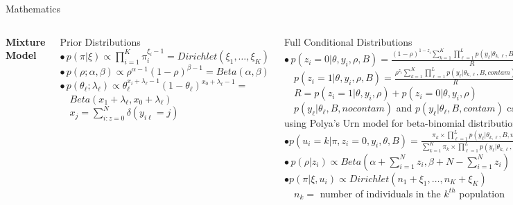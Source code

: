 \documentclass[letter,graphicx]{beamer}
\begin{document}
\begin{frame}{Mathematics}
\begin{tiny}
\begin{columns}[T]
\column{2.5in}
\begin{center}
\textbf{Mixture Model}
\end{center}

Prior Distributions \\ \vspace{2mm}
$\bullet \, p(\pi|\xi) \propto \prod_{i = 1}^K \pi_{i}^{\xi_i - 1} = Dirichlet(\xi_1, \ldots, \xi_K)$ \\
$\bullet \, p(\rho;\alpha,\beta) \propto \rho^{\alpha - 1}(1 - \rho)^{\beta - 1} = Beta(\alpha, \beta)$
$\bullet \, p(\theta_{\ell};\lambda_{\ell}) \propto \theta_{\ell}^{x_i + \lambda_{\ell}-1}(1 - \theta_{\ell})^{x_0 + \lambda_{\ell}-1} = $
\\ $\quad Beta(x_1 + \lambda_{\ell},x_0 + \lambda_{\ell})$ \\ 
$\quad x_j = \sum_{i:z=0}^{N} \delta(y_{i\ell} = j)$

Full Conditional Distributions \\ \vspace{2mm}
$\bullet \, p(z_i=0|\theta,y_i,\rho,B) = \frac{(1-\rho)^{1-z_i}\sum_{k=1}^{K} \prod_{\ell=1}^{L} p(y_{\ell}|\theta_{k,\ell},B,nocontam)}{R}$ \\ \vspace{1mm}
$\quad p(z_i=1|\theta,y_i,\rho,B) = \frac{\rho^{z_i}\sum_{k=1}^{K} \prod_{\ell=1}^{L} p(y_{\ell}|\theta_{k,\ell},B,contam)}{R}$ \\ \vspace{1mm}
$\quad R = p(z_i=1|\theta,y_i,\rho) + p(z_i = 0|\theta,y_i,\rho)$ \\ \vspace{1mm}
$\quad p(y_{\ell} |\theta_{\ell},B,nocontam)$ and $p(y_{\ell} |\theta_{\ell},B,contam)$ calculated \\
\quad using Polya's Urn model for beta-binomial distribution \\
$\bullet p(u_i = k|\pi,z_i=0,y_i,\theta,B) = \frac{\pi_k \times \prod_{\ell=1}^{L} p(y_{\ell}|\theta_{k,\ell},B,nocontam)}{\sum_{k=1}^{K} \pi_k \times \prod_{\ell=1}^{L} p(y_{\ell}|\theta_{k,\ell},B,nocontam)}$ \\
$\bullet \, p(\rho|z_i) \propto Beta(\alpha + \sum_{i=1}^{N} z_i, \beta + N - \sum_{i=1}^{N} z_i)$ \\ \vspace{1mm}
$\bullet p(\pi|\xi,u_i) \propto Dirichlet(n_1 + \xi_1, \ldots, n_K + \xi_K)$ \\
$\quad n_k =$ number of individuals in the $k^{th}$ population
\end{columns}
\end{tiny}
\end{frame} 
\end{document}
